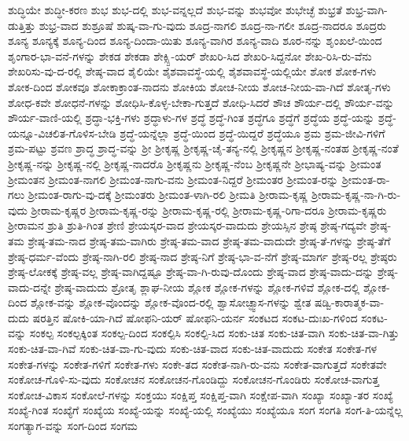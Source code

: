 {ಶುದ್ಧಿಯೇ
ಶುದ್ಧೀ-ಕರಣ
ಶುಭ
ಶುಭ-ದಲ್ಲಿ
ಶುಭ-ವನ್ನಲ್ಲದೆ
ಶುಭ-ವನ್ನು
ಶುಭವೋ
ಶುಭೇಚ್ಛೆ
ಶುಭ್ರತೆ
ಶುಭ್ರ-ವಾಗಿ-ಡುತ್ತಿತ್ತು
ಶುಭ್ರ-ವಾದ
ಶುಶ್ರೂಷೆ
ಶುಷ್ಕ-ವಾ-ಗು-ವುದು
ಶೂದ್ರ-ನಾಗಲಿ
ಶೂದ್ರ-ನಾ-ಗಲೀ
ಶೂದ್ರ-ನಾದರೂ
ಶೂದ್ರರು
ಶೂನ್ಯ
ಶೂನ್ಯಕ್ಕೆ
ಶೂನ್ಯ-ದಿಂದ
ಶೂನ್ಯ-ದಿಂದಾ-ಯಿತು
ಶೂನ್ಯ-ವಾಗಿರ
ಶೂನ್ಯ-ವಾದಿ
ಶೂರ-ನನ್ನು
ಶೃಂಖಲೆ-ಯಿಂದ
ಶೃಂಗಾರ-ಭಾ-ವನೆ-ಗಳನ್ನು
ಶೇಕಡ
ಶೇಕಡಾ
ಶೇಕ್ಸ್ಪಿ-ಯರ್
ಶೇಖರಿ-ಸಿದ
ಶೇಖರಿ-ಸಿದ್ದನೋ
ಶೇಖ-ರಿಸಿ-ರು-ವೆನು
ಶೇಖರಿಸು-ವು-ದ-ರಲ್ಲಿ
ಶೇಷ್ಠ-ವಾದ
ಶೈಲಿಯೇ
ಶೈಶವಾವಸ್ಥೆ-ಯಲ್ಲಿ
ಶೈಶವಾವಸ್ಥೆ-ಯಲ್ಲಿಯೇ
ಶೋಕ
ಶೋಕ-ಗಳು
ಶೋಕ-ದಿಂದ
ಶೋಕವೂ
ಶೋಕಾಕ್ರಾಂತ-ನಾದನು
ಶೋಕಿಯ
ಶೋಚ-ನೀಯ
ಶೋಚ-ನೀಯ-ವಾ-ಗಿದೆ
ಶೋತೃ-ಗಳು
ಶೋಧ-ಕವೇ
ಶೋಧನೆ-ಗಳನ್ನು
ಶೋಧಿಸಿ-ಕೊಳ್ಳ-ಬೇಕಾ-ಗುತ್ತದೆ
ಶೋಧಿ-ಸಿದರೆ
ಶೌಚ
ಶೌರ್ಯ-ದಲ್ಲಿ
ಶೌರ್ಯ-ವನ್ನು
ಶೌರ್ಯ-ವಾಣಿ-ಯಲ್ಲಿ
ಶ್ರದ್ಧಾ-ಭಕ್ತಿ-ಗಳು
ಶ್ರದ್ಧಾಳು-ಗಳ
ಶ್ರದ್ಧೆ
ಶ್ರದ್ಧೆ-ಗಿಂತ
ಶ್ರದ್ಧೆಗೂ
ಶ್ರದ್ಧೆಗೆ
ಶ್ರದ್ಧೆಯ
ಶ್ರದ್ಧೆ-ಯನ್ನು
ಶ್ರದ್ಧೆ-ಯನ್ನೂ-ವಿಚಲಿತ-ಗೊಳಿಸ-ಬೇಡಿ
ಶ್ರದ್ಧೆ-ಯನ್ನೆಲ್ಲಾ
ಶ್ರದ್ಧೆ-ಯಿಂದ
ಶ್ರದ್ಧೆ-ಯಿದ್ದರೆ
ಶ್ರದ್ಧೆಯೂ
ಶ್ರಮ
ಶ್ರಮ-ಜೀವಿ-ಗಳಿಗೆ
ಶ್ರಮ-ಪಟ್ಟು
ಶ್ರವಣ
ಶ್ರಾದ್ಧ
ಶ್ರಾದ್ಧ-ವನ್ನು
ಶ್ರೀ
ಶ್ರೀಕೃಷ್ಣ
ಶ್ರೀಕೃಷ್ಣ-ಚೈ-ತನ್ಯ-ನಲ್ಲಿ
ಶ್ರೀಕೃಷ್ಣನ
ಶ್ರೀಕೃಷ್ಣ-ನಂತಹ
ಶ್ರೀಕೃಷ್ಣ-ನಂತೆ
ಶ್ರೀಕೃಷ್ಣ-ನನ್ನು
ಶ್ರೀಕೃಷ್ಣ-ನಲ್ಲಿ
ಶ್ರೀಕೃಷ್ಣ-ನಾದರೊ
ಶ್ರೀಕೃಷ್ಣನು
ಶ್ರೀಕೃಷ್ಣ-ನೆಂಬ
ಶ್ರೀಕೃಷ್ಣನೇ
ಶ್ರೀಭಾಷ್ಯ-ವನ್ನು
ಶ್ರೀಮಂತ
ಶ್ರೀಮಂತನ
ಶ್ರೀಮಂತ-ನಾಗಲಿ
ಶ್ರೀಮಂತ-ನಾಗು-ವನು
ಶ್ರೀಮಂತ-ನಿದ್ದರೆ
ಶ್ರೀಮಂತರ
ಶ್ರೀಮಂತ-ರನ್ನು
ಶ್ರೀಮಂತ-ರಾ-ಗಲು
ಶ್ರೀಮಂತ-ರಾಗು-ವು-ದಕ್ಕೆ
ಶ್ರೀಮಂತರು
ಶ್ರೀಮಂತ-ಳಾಗಿ-ರಲಿ
ಶ್ರೀಮತಿ
ಶ್ರೀರಾಮ-ಕೃಷ್ಣ
ಶ್ರೀರಾಮ-ಕೃಷ್ಣ-ನಾ-ಗಿ-ರು-ವುದು
ಶ್ರೀರಾಮ-ಕೃಷ್ಣರ
ಶ್ರೀರಾಮ-ಕೃಷ್ಣ-ರನ್ನು
ಶ್ರೀರಾಮ-ಕೃಷ್ಣ-ರಲ್ಲಿ
ಶ್ರೀರಾಮ-ಕೃಷ್ಣ-ರಿಗಾ-ದರೂ
ಶ್ರೀರಾಮ-ಕೃಷ್ಣರು
ಶ್ರೀರಾಮನ
ಶ್ರುತಿ
ಶ್ರುತಿ-ಗಿಂತ
ಶ್ರೇಣಿ
ಶ್ರೇಯಸ್ಕರ-ವಾದ
ಶ್ರೇಯಸ್ಕರ-ವಾದುದು
ಶ್ರೇಯಸ್ಸಿನ
ಶ್ರೇಷ್ಠ
ಶ್ರೇಷ್ಠ-ಗದ್ಯವೇ
ಶ್ರೇಷ್ಠ-ತಮ
ಶ್ರೇಷ್ಠ-ತಮ-ನಾದ
ಶ್ರೇಷ್ಠ-ತಮ-ವಾಗಿರು
ಶ್ರೇಷ್ಠ-ತಮ-ವಾದ
ಶ್ರೇಷ್ಠ-ತಮ-ವಾದುದೇ
ಶ್ರೇಷ್ಠ-ತೆ-ಗಳನ್ನು
ಶ್ರೇಷ್ಠ-ತೆಗೆ
ಶ್ರೇಷ್ಠ-ಧರ್ಮ-ವೆಂದು
ಶ್ರೇಷ್ಠ-ನಾಗಿ-ರಲಿ
ಶ್ರೇಷ್ಠ-ನಾದ
ಶ್ರೇಷ್ಠ-ನಿಗೆ
ಶ್ರೇಷ್ಠ-ಭಾ-ವ-ನೆಗೆ
ಶ್ರೇಷ್ಠ-ಮಾರ್ಗ
ಶ್ರೇಷ್ಠ-ರಲ್ಲ
ಶ್ರೇಷ್ಠರು
ಶ್ರೇಷ್ಠ-ಲೋಕಕ್ಕೆ
ಶ್ರೇಷ್ಠ-ವಲ್ಲ
ಶ್ರೇಷ್ಠ-ವಾಗಿದ್ದಷ್ಟೂ
ಶ್ರೇಷ್ಠ-ವಾ-ಗಿ-ರುವು-ದೊಂದು
ಶ್ರೇಷ್ಠ-ವಾದ
ಶ್ರೇಷ್ಠ-ವಾದು-ದನ್ನು
ಶ್ರೇಷ್ಠ-ವಾದು-ದನ್ನೇ
ಶ್ರೇಷ್ಠ-ವಾದುದು
ಶ್ರೋತೃ
ಶ್ಲಾಘ-ನೀಯ
ಶ್ಲೋಕ
ಶ್ಲೋಕ-ಗಳನ್ನು
ಶ್ಲೋಕ-ಗಳಿವೆ
ಶ್ಲೋಕ-ದಲ್ಲಿ
ಶ್ಲೋಕ-ದಿಂದ
ಶ್ಲೋಕ-ವನ್ನು
ಶ್ಲೋಕ-ವೊಂದನ್ನು
ಶ್ಲೋಕ-ವೊಂದ-ರಲ್ಲಿ
ಶ್ವಾಸೋಚ್ಫ್ವಾಸ-ಗಳನ್ನು
ಶ್ವೇತ
ಷಡ್ವಿ-ಕಾರಾತ್ಮಕ-ವಾ-ದುದು
ಷರತ್ತಿನ
ಷೋಕಿ-ಯಾ-ಗಿದೆ
ಷೋಫನಿ-ಯರ್
ಷೋಫನಿ-ಯರ್ನ
ಸಂಕಟದ
ಸಂಕಟ-ದುಃಖ-ಗಳಿಂದ
ಸಂಕಟ-ವನ್ನು
ಸಂಕಲ್ಪ
ಸಂಕಲ್ಪಕ್ಕಿಂತ
ಸಂಕಲ್ಪ-ದಿಂದ
ಸಂಕಲ್ಪಿಸಿ
ಸಂಕಲ್ಪಿ-ಸಿದ
ಸಂಕು-ಚಿತ
ಸಂಕು-ಚಿತ-ವಾಗಿ
ಸಂಕು-ಚಿತ-ವಾ-ಗಿತ್ತು
ಸಂಕು-ಚಿತ-ವಾ-ಗಿವೆ
ಸಂಕು-ಚಿತ-ವಾ-ಗು-ವುದು
ಸಂಕು-ಚಿತ-ವಾದ
ಸಂಕು-ಚಿತ-ವಾದುದು
ಸಂಕೇತ
ಸಂಕೇತ-ಗಳ
ಸಂಕೇತ-ಗಳನ್ನು
ಸಂಕೇತ-ಗಳಿಗೆ
ಸಂಕೇತ-ಗಳು
ಸಂಕೇ-ತದ
ಸಂಕೇತ-ನಾಗಿ-ರು-ವನು
ಸಂಕೇತ-ವಾಗುತ್ತದೆ
ಸಂಕೇತವೇ
ಸಂಕೋಚ-ಗೊಳಿ-ಸು-ವುದು
ಸಂಕೋಚನ
ಸಂಕೋಚನ-ಗೊಂಡಿದ್ದು
ಸಂಕೋಚನ-ಗೊಂಡಿರು
ಸಂಕೋಚ-ವಾಗುತ್ತ
ಸಂಕೋಚ-ವಿಕಾಸ
ಸಂಕೋಲೆ-ಗಳನ್ನು
ಸಂಕ್ತಯು
ಸಂಕ್ಷಿಪ್ತ
ಸಂಕ್ಷಿಪ್ತ-ವಾಗಿ
ಸಂಕ್ಷೇಪ-ವಾಗಿ
ಸಂಖ್ಯಾ
ಸಂಖ್ಯಾ-ತರ
ಸಂಖ್ಯೆ
ಸಂಖ್ಯೆ-ಗಿಂತ
ಸಂಖ್ಯೆಗೆ
ಸಂಖ್ಯೆಯ
ಸಂಖ್ಯೆ-ಯನ್ನು
ಸಂಖ್ಯೆ-ಯಲ್ಲಿ
ಸಂಖ್ಯೆಯು
ಸಂಖ್ಯೆಯೂ
ಸಂಗ
ಸಂಗತಿ
ಸಂಗ-ತಿ-ಯನ್ನೆಲ್ಲ
ಸಂಗತ್ಯಾಗ-ವನ್ನು
ಸಂಗ-ದಿಂದ
ಸಂಗಮ
}
